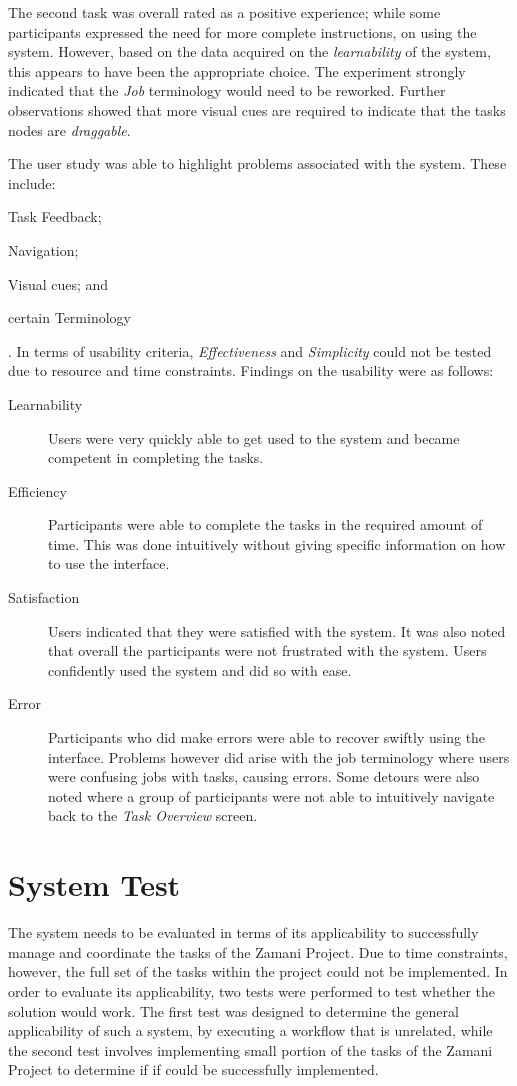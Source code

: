 \noindent The second task was overall rated as a positive experience; while some participants
expressed the need for more complete instructions, on using
the system. However, based on the data acquired on the \emph{learnability} of the
system, this appears to have been the appropriate choice. The experiment strongly
indicated that the \emph{Job} terminology would need to be reworked. Further
observations showed that more visual cues are required to indicate that the
tasks nodes are \emph{draggable}.

The user study was able to highlight problems associated with the system. These
include: \begin{inparaenum}[(i)]\item Task Feedback; \item Navigation; \item
Visual cues; and \item certain Terminology\end{inparaenum}. In terms of
usability criteria, \emph{Effectiveness} and \emph{Simplicity} could not be
tested due to resource and time constraints. Findings on the usability were as
follows:

\begin{description}
\item[Learnability] Users were very quickly able to get used to the system and
	became competent in completing the tasks.
\item[Efficiency] Participants were able to complete the tasks in the required
	amount of time. This was done intuitively without giving specific
	information on how to use the interface.
\item[Satisfaction] Users indicated that they were satisfied with the system. It
	was also noted that overall the participants were not frustrated with
	the system. Users confidently used the system and did so with ease.
\item[Error] Participants who did make errors were able to recover swiftly
	using the interface. Problems however did arise with the job terminology
	where users were confusing jobs with tasks, causing errors. Some detours
	were also noted where a group of participants were not able to
	intuitively navigate back to the \emph{Task Overview} screen.
\end{description}



\section{System Test}
The system needs to be evaluated in terms of its applicability to successfully 
manage and coordinate the tasks of the Zamani Project.
 Due to time constraints, however, the full set of the tasks within the project
could not be implemented. In order to evaluate its applicability,  two tests were
 performed to test whether the  solution would work. The first test was designed to
determine the general applicability of such a system, by executing a workflow that
is unrelated, while the second test involves implementing small portion of the tasks
of the Zamani Project to determine if if could be successfully implemented.

